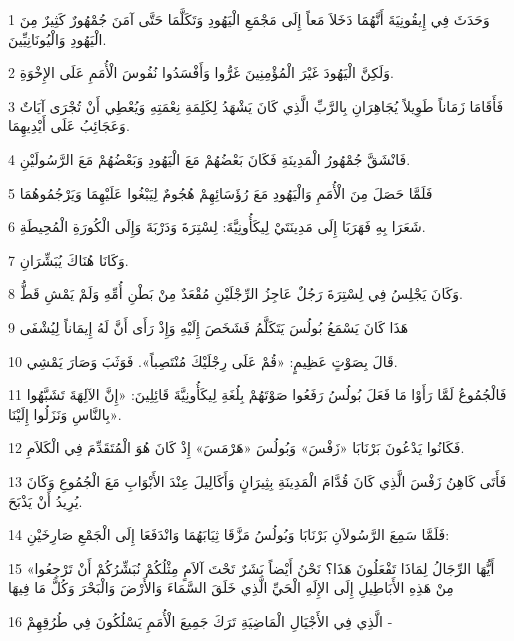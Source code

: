\par 1 وَحَدَثَ فِي إِيقُونِيَةَ أَنَّهُمَا دَخَلاَ مَعاً إِلَى مَجْمَعِ الْيَهُودِ وَتَكَلَّمَا حَتَّى آمَنَ جُمْهُورٌ كَثِيرٌ مِنَ الْيَهُودِ وَالْيُونَانِيِّينَ.
\par 2 وَلَكِنَّ الْيَهُودَ غَيْرَ الْمُؤْمِنِينَ غَرُّوا وَأَفْسَدُوا نُفُوسَ الْأُمَمِ عَلَى الإِخْوَةِ.
\par 3 فَأَقَامَا زَمَاناً طَوِيلاً يُجَاهِرَانِ بِالرَّبِّ الَّذِي كَانَ يَشْهَدُ لِكَلِمَةِ نِعْمَتِهِ وَيُعْطِي أَنْ تُجْرَى آيَاتٌ وَعَجَائِبُ عَلَى أَيْدِيهِمَا.
\par 4 فَانْشَقَّ جُمْهُورُ الْمَدِينَةِ فَكَانَ بَعْضُهُمْ مَعَ الْيَهُودِ وَبَعْضُهُمْ مَعَ الرَّسُولَيْنِ.
\par 5 فَلَمَّا حَصَلَ مِنَ الْأُمَمِ وَالْيَهُودِ مَعَ رُؤَسَائِهِمْ هُجُومٌ لِيَبْغُوا عَلَيْهِمَا وَيَرْجُمُوهُمَا
\par 6 شَعَرَا بِهِ فَهَرَبَا إِلَى مَدِينَتَيْ لِيكَأُونِيَّةَ: لِسْتِرَةَ وَدَرْبَةَ وَإِلَى الْكُورَةِ الْمُحِيطَةِ.
\par 7 وَكَانَا هُنَاكَ يُبَشِّرَانِ.
\par 8 وَكَانَ يَجْلِسُ فِي لِسْتِرَةَ رَجُلٌ عَاجِزُ الرِّجْلَيْنِ مُقْعَدٌ مِنْ بَطْنِ أُمِّهِ وَلَمْ يَمْشِ قَطُّ.
\par 9 هَذَا كَانَ يَسْمَعُ بُولُسَ يَتَكَلَّمُ فَشَخَصَ إِلَيْهِ وَإِذْ رَأَى أَنَّ لَهُ إِيمَاناً لِيُشْفَى
\par 10 قَالَ بِصَوْتٍ عَظِيمٍ: «قُمْ عَلَى رِجْلَيْكَ مُنْتَصِباً». فَوَثَبَ وَصَارَ يَمْشِي.
\par 11 فَالْجُمُوعُ لَمَّا رَأَوْا مَا فَعَلَ بُولُسُ رَفَعُوا صَوْتَهُمْ بِلُغَةِ لِيكَأُونِيَّةَ قَائِلِينَ: «إِنَّ الآلِهَةَ تَشَبَّهُوا بِالنَّاسِ وَنَزَلُوا إِلَيْنَا».
\par 12 فَكَانُوا يَدْعُونَ بَرْنَابَا «زَفْسَ» وَبُولُسَ «هَرْمَسَ» إِذْ كَانَ هُوَ الْمُتَقَدِّمَ فِي الْكَلاَمِ.
\par 13 فَأَتَى كَاهِنُ زَفْسَ الَّذِي كَانَ قُدَّامَ الْمَدِينَةِ بِثِيرَانٍ وَأَكَالِيلَ عِنْدَ الأَبْوَابِ مَعَ الْجُمُوعِ وَكَانَ يُرِيدُ أَنْ يَذْبَحَ.
\par 14 فَلَمَّا سَمِعَ الرَّسُولاَنِ بَرْنَابَا وَبُولُسُ مَزَّقَا ثِيَابَهُمَا وَانْدَفَعَا إِلَى الْجَمْعِ صَارِخَيْنِ:
\par 15 «أَيُّهَا الرِّجَالُ لِمَاذَا تَفْعَلُونَ هَذَا؟ نَحْنُ أَيْضاً بَشَرٌ تَحْتَ آلاَمٍ مِثْلُكُمْ نُبَشِّرُكُمْ أَنْ تَرْجِعُوا مِنْ هَذِهِ الأَبَاطِيلِ إِلَى الإِلَهِ الْحَيِّ الَّذِي خَلَقَ السَّمَاءَ وَالأَرْضَ وَالْبَحْرَ وَكُلَّ مَا فِيهَا
\par 16 الَّذِي فِي الأَجْيَالِ الْمَاضِيَةِ تَرَكَ جَمِيعَ الْأُمَمِ يَسْلُكُونَ فِي طُرُقِهِمْ -
